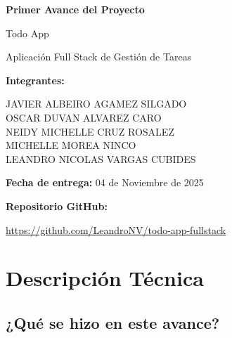 \documentclass[12pt,a4paper]{article}
\begin{document}
\begin{titlepage}
    \centering
    \vspace{2cm}
    
    {\Huge\bfseries Primer Avance del Proyecto\par}
    \vspace{1cm}
    {\LARGE Todo App\par}
    \vspace{0.5cm}
    {\large Aplicación Full Stack de Gestión de Tareas\par}
    
    \vspace{3cm}
    
    {\Large\textbf{Integrantes:}\par}
    \vspace{0.5cm}
    {\large
        JAVIER ALBEIRO AGAMEZ SILGADO\\[0.3cm]
        OSCAR DUVAN ALVAREZ CARO\\[0.3cm]
        NEIDY MICHELLE CRUZ ROSALEZ\\[0.3cm]
        MICHELLE MOREA NINCO\\[0.3cm]
        LEANDRO NICOLAS VARGAS CUBIDES\\[0.3cm]
    }
    
    \vfill
    
    {\large\textbf{Fecha de entrega:} 04 de Noviembre de 2025\par}
    \vspace{0.5cm}
    {\large\textbf{Repositorio GitHub:}\par}
    \vspace{0.3cm}
    {\small\url{https://github.com/LeandroNV/todo-app-fullstack}\par}
    
    \vspace{1cm}
\end{titlepage}

\tableofcontents
\newpage

\section{Descripción Técnica}

\subsection{¿Qué se hizo en este avance?}
\end{document}
